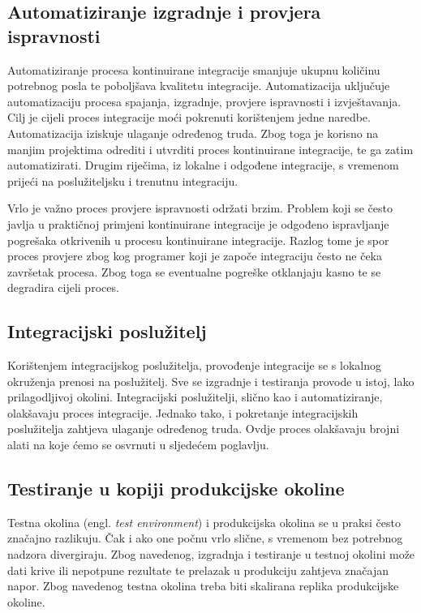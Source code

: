 \documentclass[times, utf8, seminar, numeric]{fer}
\newcommand{\eng}[1]{(engl. \textit{#1})}
\begin{document}
\subsection{Automatiziranje izgradnje i provjera ispravnosti}
Automatiziranje procesa kontinuirane integracije smanjuje ukupnu količinu potrebnog posla te poboljšava kvalitetu integracije. Automatizacija uključuje automatizaciju procesa spajanja, izgradnje, provjere ispravnosti i izvještavanja. Cilj je cijeli proces integracije moći pokrenuti korištenjem jedne naredbe.  Automatizacija iziskuje ulaganje određenog truda. Zbog toga je korisno na manjim projektima odrediti i utvrditi proces kontinuirane integracije, te ga zatim automatizirati. Drugim riječima, iz lokalne i odgođene integracije, s vremenom prijeći na poslužiteljsku i trenutnu integraciju.

Vrlo je važno proces provjere ispravnosti održati brzim. Problem koji se često javlja u praktičnoj primjeni kontinuirane integracije je odgođeno ispravljanje pogrešaka otkrivenih u procesu kontinuirane integracije. Razlog tome je spor proces provjere zbog kog programer koji je započe integraciju često ne čeka završetak procesa. Zbog toga se eventualne pogreške otklanjaju kasno te se degradira cijeli proces.

\subsection{Integracijski poslužitelj}
Korištenjem integracijskog poslužitelja, provođenje integracije se s lokalnog okruženja prenosi na poslužitelj. Sve se izgradnje i testiranja provode u istoj, lako prilagodljivoj okolini. Integracijski poslužitelji, slično kao i automatiziranje, olakšavaju proces integracije. Jednako tako, i pokretanje integracijskih poslužitelja zahtjeva ulaganje određenog truda. Ovdje proces olakšavaju brojni alati na koje ćemo se osvrnuti u sljedećem poglavlju.

\subsection{Testiranje u kopiji produkcijske okoline}
Testna okolina \eng{test environment} i produkcijska okolina se u praksi često značajno razlikuju. Čak i ako one počnu vrlo slične, s vremenom bez potrebnog nadzora divergiraju. Zbog navedenog, izgradnja i testiranje u testnoj okolini može dati krive ili nepotpune rezultate te prelazak u produkciju zahtjeva značajan napor. Zbog navedenog testna okolina treba biti skalirana replika produkcijske okoline. 
\end{document}
